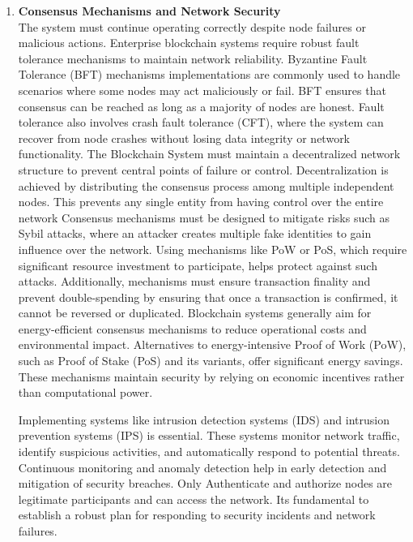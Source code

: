 \begin{enumerate}[label=\textbullet]
	\item\textbf{Consensus Mechanisms and Network Security}\\
	The system must continue operating correctly despite node failures or malicious actions. Enterprise blockchain systems require robust fault tolerance mechanisms to maintain network reliability. Byzantine Fault Tolerance (BFT) mechanisms implementations are commonly used to handle scenarios where some nodes may act maliciously or fail. BFT ensures that consensus can be reached as long as a majority of nodes are honest. Fault tolerance also involves crash fault tolerance (CFT), where the system can recover from node crashes without losing data integrity or network functionality. 
	The Blockchain System must maintain a decentralized network structure to prevent central points of failure or control. Decentralization is achieved by distributing the consensus process among multiple independent nodes. This prevents any single entity from having control over the entire network Consensus mechanisms must be designed to mitigate risks such as Sybil attacks, where an attacker creates multiple fake identities to gain influence over the network. Using mechanisms like PoW or PoS, which require significant resource investment to participate, helps protect against such attacks. Additionally, mechanisms must ensure transaction finality and prevent double-spending by ensuring that once a transaction is confirmed, it cannot be reversed or duplicated. Blockchain systems generally aim for energy-efficient consensus mechanisms to reduce operational costs and environmental impact. Alternatives to energy-intensive Proof of Work (PoW), such as Proof of Stake (PoS) and its variants, offer significant energy savings. These mechanisms maintain security by relying on economic incentives rather than computational power.

	Implementing systems like intrusion detection systems (IDS) and intrusion prevention systems (IPS) is essential. These systems monitor network traffic, identify suspicious activities, and automatically respond to potential threats. Continuous monitoring and anomaly detection help in early detection and mitigation of security breaches. Only Authenticate and authorize nodes are legitimate participants and can access the network. Its fundamental to establish a robust plan for responding to security incidents and network failures. 


\end{enumerate}
